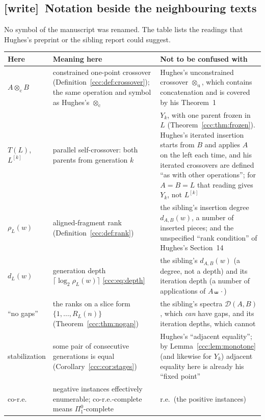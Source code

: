 \documentclass[11pt,letterpaper]{article}
\theoremstyle{definition}
\theoremstyle{remark}
\newcommand{\cut}{\otimes_{\mathrm c}}
\newcommand{\gen}[2]{#1^{[#2]}}
\newcommand{\rank}{\rho}
\newcommand{\sh}{\mathbin{\shuffle}}
\newcommand{\wtag}{\textup{[write]}}
\begin{document}
\subsection{\texorpdfstring{\wtag\ }{}Notation beside the neighbouring texts}
\label{ccc:sec:notation}

No symbol of the manuscript was renamed. The table lists the readings that
Hughes's preprint or the sibling report could suggest.

\begin{center}\small
\begin{tabular}{@{}>{\raggedright\arraybackslash}p{}>{\raggedright\arraybackslash}p{}>{\raggedright\arraybackslash}p{}@{}}
\toprule
\textbf{Here} & \textbf{Meaning here} & \textbf{Not to be confused with}\\
\midrule
$A\cut B$ & constrained one-point crossover (Definition~\ref{ccc:def:crossover}); the same operation and symbol as Hughes's $\otimes_{\mathrm c}$ &
Hughes's unconstrained crossover $\otimes_{\mathrm u}$, which contains concatenation and is covered by his Theorem~1\\[3pt]
$T(L)$, $\gen Lk$ & parallel self-crossover: both parents from generation $k$ &
$Y_k$, with one parent frozen in~$L$ (Theorem~\ref{ccc:thm:frozen}). Hughes's iterated insertion starts from $B$ and applies $A$ on the left each time, and his iterated crossovers are defined ``as with other operations''; for $A=B=L$ that reading gives $Y_k$, not $\gen Lk$\\[3pt]
$\rank_L(w)$ & aligned-fragment rank (Definition~\ref{ccc:def:rank}) &
the sibling's insertion degree $d_{A,B}(w)$, a number of inserted pieces; and the unspecified ``rank condition'' of Hughes's Section~14\\[3pt]
$d_L(w)$ & generation depth $\lceil\log_2\rank_L(w)\rceil$ \eqref{ccc:eq:depth} &
the sibling's $d_{A,B}(w)$ (a degree, not a depth) and its iteration depth (a number of applications of $A\sh{}\cdot$)\\[3pt]
``no gaps'' & the ranks on a slice form $\{1,\ldots,R_L(n)\}$ (Theorem~\ref{ccc:thm:nogap}) &
the sibling's spectra $\mathcal D(A,B)$, which \emph{can} have gaps, and its iteration depths, which cannot\\[3pt]
stabilization & some pair of consecutive generations is equal (Corollary~\ref{ccc:cor:stages}) &
Hughes's ``adjacent equality''; by Lemma~\ref{ccc:lem:monotone} (and likewise for $Y_k$) adjacent equality here is already his ``fixed point''\\[3pt]
co-r.e.\ & negative instances effectively enumerable; co-r.e.-complete means $\Pi^0_1$-complete &
r.e.\ (the positive instances)\\
\bottomrule
\end{tabular}
\end{center}
\end{document}
